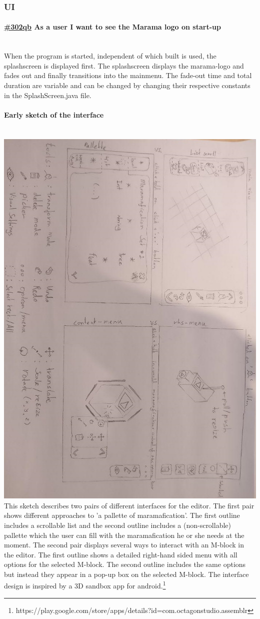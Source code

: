 \documentclass[10pt]{extarticle} %
\newcommand{\myparagraph}[1]{\paragraph{#1}\mbox{}\\} %
\begin{document}
    \subsubsection{UI}
    \myparagraph{\href{\clickup{302qb}}{\#302qb} As a user I want to see the Marama logo on start-up}
    When the program is started, independent of which built is used, the splashscreen is displayed first.
    The splashscreen displays the marama-logo and fades out and finally transitions into the mainmenu.
    The fade-out time and total duration are variable and can be changed by changing their respective constants in the SplashScreen.java file.

    \myparagraph{Early sketch of the interface}
    \includegraphics[width=1\linewidth]{marama-view-sketch.jpg}
    This sketch describes two pairs of different interfaces for the editor.
    The first pair shows different approaches to 'a pallette of maramafication'.
    The first outline includes a scrollable list and the second outline includes a (non-scrollable) pallette which the user can fill with the maramafication he or she needs at the moment.
    The second pair displays several ways to interact with an M-block in the editor.
    The first outline shows a detailed right-hand sided menu with all options for the selected M-block.
    The second outline includes the same options but instead they appear in a pop-up box on the selected M-block.
    The interface design is inspired by a 3D sandbox app for android.\footnote[1]{https://play.google.com/store/apps/details?id=com.octagonstudio.assemblr}
\end{document}
